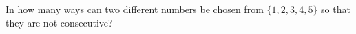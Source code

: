 In how many ways can two different numbers be chosen from $\{1,2,3,4,5\}$ so that they are not consecutive?
